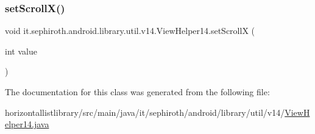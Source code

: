 \subsubsection{\texorpdfstring{set\+Scroll\+X()}{setScrollX()}}
{\footnotesize\ttfamily void it.\+sephiroth.\+android.\+library.\+util.\+v14.\+View\+Helper14.\+set\+ScrollX (\begin{DoxyParamCaption}\item[{int}]{value }\end{DoxyParamCaption})}



The documentation for this class was generated from the following file\+:\begin{DoxyCompactItemize}
\item 
horizontallistlibrary/src/main/java/it/sephiroth/android/library/util/v14/\hyperlink{_view_helper14_8java}{View\+Helper14.\+java}\end{DoxyCompactItemize}
